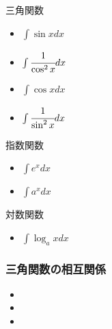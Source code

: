 \documentclass[10pt,dvipdfmx]{jsarticle}
\begin{document}
三角関数
\begin{multicols}{2}
  \begin{Large}
    \begin{itemize}
      \item $\int \sin x dx$
      \item $\int \cfrac{1}{\cos^2 x} dx$
      \item $\int \cos x dx$
      \item $\int \cfrac{1}{\sin^2 x} dx$
    \end{itemize}
  \end{Large}
\end{multicols}
指数関数
\begin{multicols}{2}
  \begin{Large}
    \begin{itemize}
      \item $\int e^x dx$
      \item $\int a^x dx$
    \end{itemize}
  \end{Large}
\end{multicols}
対数関数
\begin{multicols}{2}
  \begin{Large}
    \begin{itemize}
      \item $\int \log_a x dx$
    \end{itemize}
  \end{Large}
\end{multicols}

\subsubsection*{三角関数の相互関係}
\begin{multicols}{3}
  \begin{Large}
    \begin{itemize}
      \item \item \item
    \end{itemize}
  \end{Large}
\end{multicols}
\end{document}

